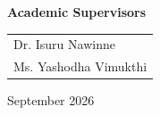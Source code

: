 {\begin{titlepage}
    \vspace{1cm}
    
    \begin{minipage}{0.8\textwidth}
      \centering
      {\normalsize\textbf{Academic Supervisors}}\\[10pt]
      \begin{tabular}{l}
        \textcolor{slate600}{Dr. Isuru Nawinne} \\[4pt]
        \textcolor{slate600}{Ms. Yashodha Vimukthi} \\
      \end{tabular}
    \end{minipage}
    
    \vfill
    
    {\normalsize\textcolor{slate400}{September 2026}}
    
  \end{titlepage}
}
